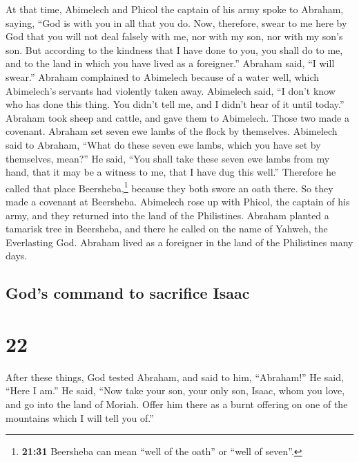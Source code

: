  At that time, Abimelech and Phicol the captain of his
army spoke to Abraham, saying, ``God is with you in all that you do.
 Now, therefore, swear to me here by God that you will
not deal falsely with me, nor with my son, nor with my son's son. But
according to the kindness that I have done to you, you shall do to me,
and to the land in which you have lived as a foreigner.''
 Abraham said, ``I will swear.''  Abraham
complained to Abimelech because of a water well, which Abimelech's
servants had violently taken away.  Abimelech said, ``I
don't know who has done this thing. You didn't tell me, and I didn't
hear of it until today.''  Abraham took sheep and cattle,
and gave them to Abimelech. Those two made a covenant. 
Abraham set seven ewe lambs of the flock by themselves. 
Abimelech said to Abraham, ``What do these seven ewe lambs, which you
have set by themselves, mean?''  He said, ``You shall
take these seven ewe lambs from my hand, that it may be a witness to me,
that I have dug this well.''  Therefore he called that
place Beersheba,\footnote{\textbf{21:31} Beersheba can mean ``well of
  the oath'' or ``well of seven''.} because they both swore an oath
there.  So they made a covenant at Beersheba. Abimelech
rose up with Phicol, the captain of his army, and they returned into the
land of the Philistines.  Abraham planted a tamarisk tree
in Beersheba, and there he called on the name of Yahweh, the Everlasting
God.  Abraham lived as a foreigner in the land of the
Philistines many days.

\hypertarget{gods-command-to-sacrifice-isaac}{%
\subsection{God's command to sacrifice
Isaac}\label{gods-command-to-sacrifice-isaac}}

\hypertarget{section-21}{%
\section{22}\label{section-21}}

 After these things, God tested Abraham, and said to him,
``Abraham!'' He said, ``Here I am.''  He said, ``Now take
your son, your only son, Isaac, whom you love, and go into the land of
Moriah. Offer him there as a burnt offering on one of the mountains
which I will tell you of.''

